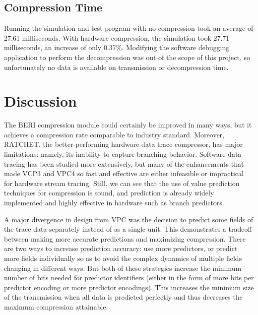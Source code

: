 \documentclass[conference]{IEEEtran}
\begin{document}
\subsection{Compression Time}
Running the simulation and test program with no compression took an average of 27.61 milliseconds. With hardware compression, the simulation took 27.71 milliseconds, an increase of only 0.37\%. Modifying the software debugging application to perform the decompression was out of the scope of this project, so unfortunately no data is available on transmission or decompression time. 


\section{Discussion}


The BERI compression module could certainly be improved in many ways, but it achieves a compression rate comparable to industry standard. Moreover, RATCHET, the better-performing hardware data trace compressor, has major limitations: namely, its inability to capture branching behavior. Software data tracing has been studied more extensively, but many of the enhancements that made VCP3 and VPC4 so fast and effective are either infeasible or impractical for hardware stream tracing. Still, we can see that the use of value prediction techniques for compression is sound, and prediction is already widely implemented and highly effective in hardware such as branch predictors.  

A major divergence in design from VPC was the decision to predict some fields of the trace data separately instead of as a single unit. This demonstrates a tradeoff between making more accurate predictions and maximizing compression. There are two ways to increase prediction accuracy: use more predictors, or predict more fields individually so as to avoid the complex dynamics of multiple fields changing in different ways. But both of these strategies increase the minimum number of bits needed for predictor identifiers (either in the form of more bits per predictor encoding or more predictor encodings). This increases the minimum size of the transmission when all data is predicted perfectly and thus decreases the maximum compression attainable. 
 
\end{document}
